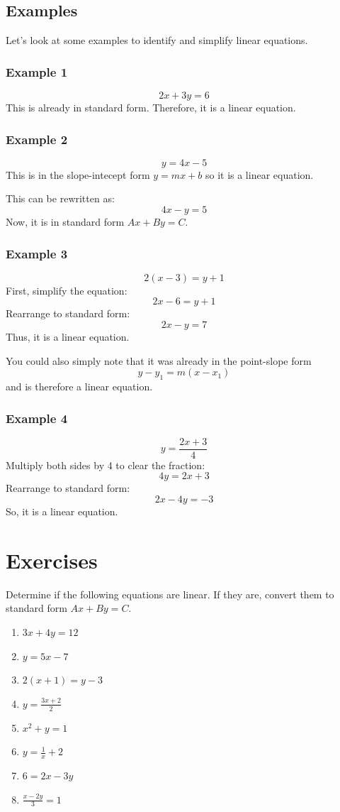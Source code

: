 \documentclass{article}
\begin{document}
\subsection*{Examples}
Let's look at some examples to identify and simplify linear equations.

\subsubsection*{Example 1}
\[
2x + 3y = 6
\]
This is already in standard form. Therefore, it is a linear equation.

\subsubsection*{Example 2}
\[
y = 4x - 5
\]
This is in the slope-intecept form $y=mx+b$ so it is a linear equation.

This can be rewritten as:
\[
4x - y = 5
\]
Now, it is in standard form \(Ax + By = C\).

\subsubsection*{Example 3}
\[
2(x - 3) = y + 1
\]
First, simplify the equation:
\[
2x - 6 = y + 1
\]
Rearrange to standard form:
\[
2x - y = 7
\]
Thus, it is a linear equation.

You could also simply note that it was already in the point-slope form \[y - y_1 = m(x - x_1)\] and is therefore a linear equation.

\subsubsection*{Example 4}
\[
y = \frac{2x + 3}{4}
\]
Multiply both sides by 4 to clear the fraction:
\[
4y = 2x + 3
\]
Rearrange to standard form:
\[
2x - 4y = -3
\]
So, it is a linear equation.

\section*{Exercises}
Determine if the following equations are linear. If they are, convert them to standard form \(Ax + By = C\).

\begin{multicols}{2}
\begin{enumerate}
    \item \(3x + 4y = 12\)
    \item \(y = 5x - 7\)
    \item \(2(x + 1) = y - 3\)
    \item \(y = \frac{3x + 2}{2}\)
    \item \(x^2 + y = 1\)
    \item \(y = \frac{1}{x} + 2\)
    \item \(6 = 2x - 3y\)
    \item \(\frac{x - 2y}{3} = 1\)
\end{enumerate}
\end{multicols}
\end{document}
